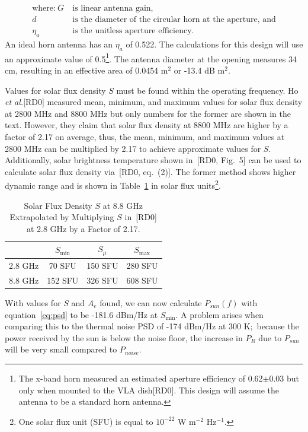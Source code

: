 \documentclass[titlepage]{article}
\newcommand{\nraocite}[1]{[RD0\cite{#1}]}
\newcommand{\nraoprecite}[2][]{[RD0\cite{#2}{, #1}]}
\begin{document}
\begin{align*} 
    \text{where:}~G ~&\text{is linear antenna gain,}\\
           d        ~&\text{is the diameter of the circular horn at the aperture, and}\\
           \eta_a   ~&\text{is the unitless aperture efficiency.}
\end{align*}
An ideal horn antenna has an $\eta_a$ of 0.522. The calculations for this design will use an approximate value of 0.5\footnote{The x-band horn measured an estimated aperture efficiency of 0.62$\pm$0.03 but only when mounted to the VLA dish\nraocite{xbandvla}. This design will assume the antenna to be a standard horn antenna.}. The antenna diameter at the opening measures 34 cm, resulting in an effective area of 0.0454 m$^2$ or -13.4 dB m$^2$.

Values for solar flux density $S$ must be found within the operating frequency. Ho \textit{et al.}\nraocite{solartemp} measured mean, minimum, and maximum values for solar flux density at 2800 MHz and 8800 MHz but only numbers for the former are shown in the text. However, they claim that solar flux density at 8800 MHz are higher by a factor of 2.17 on average, thus, the mean, minimum, and maximum values at 2800 MHz can be multiplied by 2.17 to achieve approximate values for $S$. Additionally, solar brightness temperature shown in~\nraoprecite[Fig.~5]{solartemp} can be used to calculate solar flux density via~\nraoprecite[eq.~(2)]{solartemp}. The former method shows higher dynamic range and is shown in Table~\ref{tab:sfd} in solar flux units\footnote{One solar flux unit (SFU) is equal to $10^{-22}$ W m$^{-2}$ Hz$^{-1}$.}.
\begin{table}[!ht]
\centering
\begin{tabular}{c|c|c|c}
    & $S_{\min}$ & $S_{\mu}$ & $S_{\max}$ \\ \hline
    2.8 GHz & 70 SFU & 150 SFU & 280 SFU \\
    8.8 GHz & 152 SFU & 326 SFU & 608 SFU
\end{tabular}
\caption{Solar Flux Density $S$ at 8.8 GHz Extrapolated by Multiplying $S$ in~\color{captioncolor}\nraocite{solartemp} at 2.8 GHz by a Factor of 2.17.} \label{tab:sfd}
\end{table}

With values for $S$ and $A_e$ found, we can now calculate $P_{sun}(f)$ with equation~\ref{eq:psd} to be -181.6 dBm/Hz at $S_{\min}$. A problem arises when comparing this to the thermal noise PSD of -174 dBm/Hz at 300 K;\ because the power received by the sun is below the noise floor, the increase in $P_R$ due to $P_{sun}$ will be very small compared to $P_{noise}$.
\end{document}
